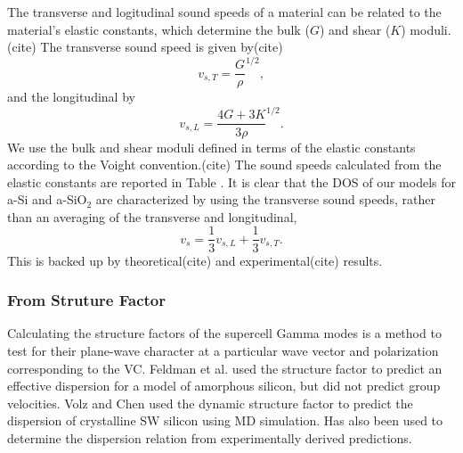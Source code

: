 \documentclass[aps,prb,twocolumn,superscriptaddress,footinbib,amsmath,amssymb,floatfix]{revtex4}
\begin{document}
The transverse and logitudinal sound speeds of a material can be related 
to the material's elastic constants, which determine the bulk ($G$) and 
shear ($K$) moduli.(cite) The transverse sound speed is given by(cite)  
\begin{equation}\label{EQ:Dynamical}
v_{s,T} = \frac{G}{\rho}^{1/2},
\end{equation}
and the longitudinal by
\begin{equation}\label{EQ:Dynamical}
v_{s,L} = \frac{4G + 3K}{3\rho}^{1/2}.
\end{equation}
We use the bulk and shear moduli defined in terms of the elastic 
constants according to the Voight convention.(cite) 
The sound speeds calculated from the 
elastic constants are reported in Table . It is clear that the DOS of 
our models for a-Si and a-SiO$_2$ are characterized by using the 
transverse sound speeds, rather than an averaging of the transverse 
and longitudinal, 
\begin{equation}\label{EQ:Dynamical}
v_{s} = \frac{1}{3}v_{s,L} + \frac{1}{3}v_{s,T}. 
\end{equation}
This is backed up by theoretical(cite) and experimental(cite) results. 

\subsubsection{\label{S:Structure}From Struture Factor}

Calculating the structure factors of the supercell Gamma   
modes is a method to test for their plane-wave 
character at a particular wave vector and 
polarization corresponding to the VC. 
\cite{allen_diffusons_1999,feldman_numerical_1999} 
Feldman et al. used the structure factor to predict an effective 
dispersion for a model of amorphous silicon, but did not predict 
group velocities.\cite{feldman_numerical_1999} 
Volz and Chen used the dynamic structure factor to predict the
dispersion of crystalline SW silicon using MD simulation.
\cite{volz_molecular-dynamics_2000} Has also been used to determine 
the dispersion relation from experimentally derived predictions.
\cite{green_density_2011} 
\end{document}
